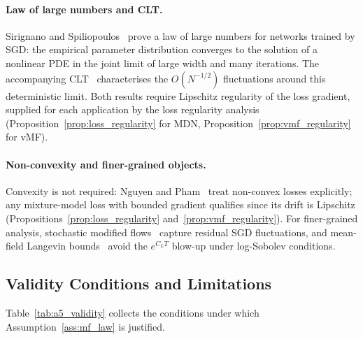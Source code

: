 \documentclass[11pt]{article}
\begin{document}
\paragraph{Law of large numbers and CLT.}
Sirignano and Spiliopoulos~\cite{sirignano2020lln} prove a law of
large numbers for networks trained by SGD: the empirical parameter
distribution converges to the solution of a nonlinear PDE in the
joint limit of large width and many iterations.
The accompanying CLT~\cite{sirignano2020clt} characterises
the $O(N^{-1/2})$ fluctuations around this deterministic limit.
Both results require Lipschitz regularity of the loss gradient,
supplied for each application by the loss regularity analysis
(Proposition~\ref{prop:loss_regularity} for MDN,
Proposition~\ref{prop:vmf_regularity} for vMF).

\paragraph{Non-convexity and finer-grained objects.}
Convexity is not required: Nguyen and
Pham~\cite{nguyen2023multilayer} treat non-convex losses explicitly;
any mixture-model loss with bounded gradient qualifies since its drift is Lipschitz
(Propositions~\ref{prop:loss_regularity} and~\ref{prop:vmf_regularity}).
For finer-grained analysis, stochastic modified
flows~\cite{gess2024smf} capture residual SGD fluctuations, and
mean-field Langevin bounds~\cite{suzuki2023mfld} avoid the
$e^{C_L T}$ blow-up under log-Sobolev conditions.

\subsection{Validity Conditions and Limitations}\label{app:mf_summary}

Table~\ref{tab:a5_validity} collects the conditions under which
Assumption~\ref{ass:mf_law} is justified.
\end{document}
